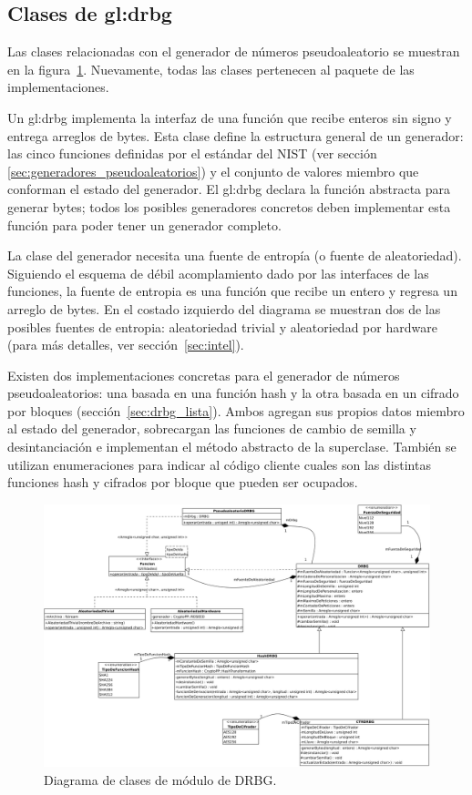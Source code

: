 %
%
%

\subsection{Clases de \texorpdfstring{\acrshort{gl:drbg}}{DRBG}}
\label{sec:drbg_disenio}

Las clases relacionadas con el generador de números pseudoaleatorio se muestran
en la figura~\ref{clases_drbg}. Nuevamente, todas las clases pertenecen al
paquete de las implementaciones.

Un \gls{gl:drbg} implementa la interfaz de una función que recibe enteros sin
signo y entrega arreglos de bytes. Esta clase define la estructura general de un
generador: las cinco funciones definidas por el estándar del NIST (ver sección
\ref{sec:generadores_pseudoaleatorios}) y el conjunto de valores miembro que
conforman el estado del generador. El \gls{gl:drbg} declara la función abstracta
para generar bytes; todos los posibles generadores concretos deben implementar
esta función para poder tener un generador completo.

La clase del generador necesita una fuente de entropía (o fuente de
aleatoriedad). Siguiendo el esquema de débil acomplamiento dado por las
interfaces de las funciones, la fuente de entropia es una función que recibe un
entero y regresa un arreglo de bytes. En el costado izquierdo del diagrama se
muestran dos de las posibles fuentes de entropia: aleatoriedad trivial y
aleatoriedad por hardware (para más detalles, ver sección~\ref{sec:intel}).

Existen dos implementaciones concretas para el generador de números
pseudoaleatorios: una basada en una función hash y la otra basada en un cifrado
por bloques (sección~\ref{sec:drbg_lista}). Ambos agregan sus propios datos
miembro al estado del generador, sobrecargan las funciones de cambio de semilla
y desintanciación e implementan el método abstracto de la superclase. También se
utilizan enumeraciones para indicar al código cliente cuales son las distintas
funciones hash y cifrados por bloque que pueden ser ocupados.

\begin{figure}
  \begin{center}
    \includegraphics[width=0.8\linewidth]{diagramas/drbg.png}
    \caption{Diagrama de clases de módulo de DRBG.}
    \label{clases_drbg}
  \end{center}
\end{figure}
